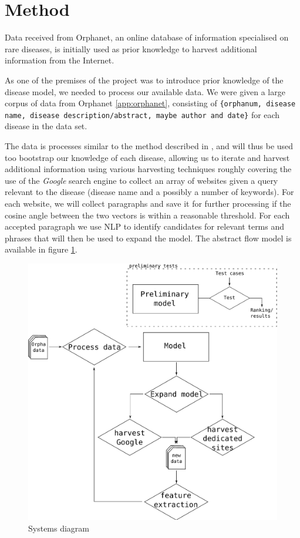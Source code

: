 \documentclass[10pt,letterpaper,final]{article}
\begin{document}
\section{Method}
Data received from Orphanet, an online database of information
specialised on rare diseases, is initially used as prior knowledge to
harvest additional information from the Internet.



As one of the premises of the project was to introduce prior knowledge
of the disease model, we needed to process our available data. We were
given a large corpus of data from Orphanet \ref{app:orphanet},
consisting of \texttt{\{orphanum, disease name, disease
description/abstract, maybe author and date\}} for each disease in the
data set.


The data is processes similar to the method described in
\cite{jensenandersen}, and will thus be used too bootstrap our knowledge
of each disease, allowing us to iterate and harvest additional
information using various harvesting techniques roughly covering the use
of the \textit{Google} search engine to collect an array of websites
given a query relevant to the disease (disease name and a possibly a
number of keywords). For each website, we will collect paragraphs and
save it for further processing if the cosine angle between the two
vectors is within a reasonable threshold. For each accepted paragraph we
use NLP to identify candidates for relevant terms and phrases that will
then be used to expand the model. The abstract flow model is available
in figure \ref{fig:flow}.


\begin{figure}[htp!]
\begin{center}
\includegraphics[scale=0.4]{images/pipeline}
\caption{Systems diagram}
\label{fig:flow}
\end{center}
\end{figure}
\end{document}

